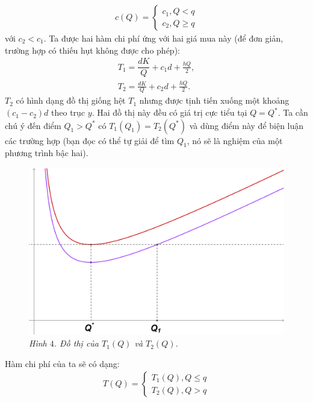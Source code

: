 \begin{multicols}{2}
	\begin{align*}
		c(Q)= \begin{cases}
			c_1,Q <q\\
			c_2,Q \ge q
		\end{cases}
	\end{align*}
	với $c_2<c_1$.
	\vskip 0.1cm
	Ta được hai hàm chi phí ứng với hai giá mua này (để đơn giản, trường hợp có thiếu hụt không được cho phép):
	\begin{align*}
		T_1 = \dfrac{dK}{Q} + c_1d  + \frac{hQ}{2},\\
		T_2 = \frac{dK}{Q} + c_2d + \frac{hQ}{2}.
	\end{align*}
	$T_2$ có hình dạng đồ thị giống hệt $T_1$ nhưng được tịnh tiến xuống một khoảng $(c_1-c_2 )d$ theo trục $y$. Hai đồ thị này đều có giá trị cực tiểu tại $Q=Q^*$. Ta cần chú ý đến điểm $Q_1>Q^*$ có $T_1 (Q_1 )=T_2 (Q^*)$ và dùng điểm này để biện luận các trường hợp (bạn đọc có thể tự giải để tìm $Q_1$, nó sẽ là nghiệm của một phương trình bậc hai).
	\begin{figure}[H]
		\vspace*{-5pt}
		\centering
		\captionsetup{labelformat= empty, justification=centering}
		\includegraphics[width= 1\linewidth]{5}
		\caption{\small\textit{\color{toanhocdoisong}Hình $4$. Đồ thị của $T_1(Q)$ và $T_2(Q)$.}}
		\vspace*{-10pt}
	\end{figure}
	Hàm chi phí của ta sẽ có dạng:
	\begin{align*}
		T(Q) = \begin{cases}
			T_1(Q),Q \le q\\
			T_2(Q),Q > q
		\end{cases}
	\end{align*}

\end{multicols}

